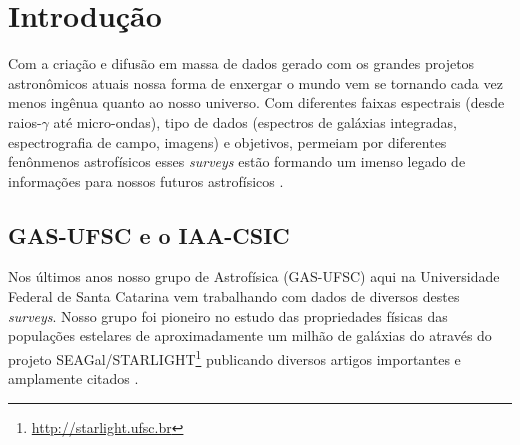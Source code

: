 


\chapter{Introdução}
\label{sec:intro}

Com a criação e difusão em massa de dados gerado com os grandes projetos astronômicos atuais nossa
forma de enxergar o mundo vem se tornando cada vez menos ingênua quanto ao nosso universo. Com
diferentes faixas espectrais (desde raios-$\gamma$ até micro-ondas), tipo de dados (espectros de
galáxias integradas, espectrografia de campo, imagens) e objetivos, permeiam por diferentes
fenônmenos astrofísicos esses {\em surveys} estão formando um imenso legado de informações para
nossos futuros astrofísicos .
 

\section{GAS-UFSC e o IAA-CSIC}
\label{sec:intro:UFSCeIAA}

Nos últimos anos nosso grupo de Astrofísica (GAS-UFSC) aqui na Universidade Federal de Santa
Catarina vem trabalhando com dados de diversos destes {\em surveys}. Nosso grupo foi pioneiro no
estudo das propriedades físicas das populações estelares de aproximadamente um milhão de galáxias do
\SDSS através do projeto
SEAGal/STARLIGHT\footnote{\href{http://starlight.ufsc.br}{http://starlight.ufsc.br}} publicando
diversos artigos importantes e amplamente citados \citep[e.g., ][]{CidFernandes.etal.2005a,
Mateus.etal.2006a, Stasinska.etal.2006a, Asari.etal.2007a, Stasinska.etal.2008a,
CidFernandes.etal.2011a}.

